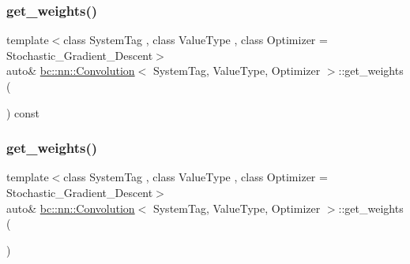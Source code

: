 \subsubsection{\texorpdfstring{get\+\_\+weights()}{get\_weights()}\hspace{0.1cm}{\footnotesize\ttfamily [1/2]}}
{\footnotesize\ttfamily template$<$class System\+Tag , class Value\+Type , class Optimizer  = Stochastic\+\_\+\+Gradient\+\_\+\+Descent$>$ \\
auto\& \hyperlink{structbc_1_1nn_1_1Convolution}{bc\+::nn\+::\+Convolution}$<$ System\+Tag, Value\+Type, Optimizer $>$\+::get\+\_\+weights (\begin{DoxyParamCaption}{ }\end{DoxyParamCaption}) const\hspace{0.3cm}{\ttfamily [inline]}}

\mbox{\label{structbc_1_1nn_1_1Convolution_ab289909aceb1a72033c611db85282688}} 
\subsubsection{\texorpdfstring{get\+\_\+weights()}{get\_weights()}\hspace{0.1cm}{\footnotesize\ttfamily [2/2]}}
{\footnotesize\ttfamily template$<$class System\+Tag , class Value\+Type , class Optimizer  = Stochastic\+\_\+\+Gradient\+\_\+\+Descent$>$ \\
auto\& \hyperlink{structbc_1_1nn_1_1Convolution}{bc\+::nn\+::\+Convolution}$<$ System\+Tag, Value\+Type, Optimizer $>$\+::get\+\_\+weights (\begin{DoxyParamCaption}{ }\end{DoxyParamCaption})\hspace{0.3cm}{\ttfamily [inline]}}

\mbox{\label{structbc_1_1nn_1_1Convolution_afb8adcb9bfa9854fba8b609987ff8809}} 
